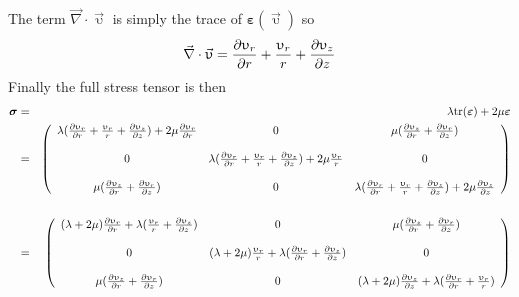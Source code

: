 The term $\vec\nabla \cdot \vec{\upupsilon}$ is simply the trace of ${\bm \varepsilon}(\vec{\upupsilon})$ so 
\[
\vec\nabla \cdot \vec{\upupsilon}
= {\partial \upupsilon_r \over \partial r} 
+{\upupsilon_r \over r}
+{\partial \upupsilon_{z} \over \partial z}
\]
Finally the full stress tensor is then 
\begin{eqnarray}
{\bm \sigma}
&=& \lambda {\rm tr} ({\bm \varepsilon}) + 2 \mu {\bm \varepsilon} \nonumber\\
&=&
\left(
\begin{array}{ccc}
\lambda({\partial  \upupsilon_r \over \partial  r}
+{\upupsilon_r \over r} +{\partial  \upupsilon_{z} \over \partial z}) +
2\mu {\partial  \upupsilon_r \over \partial  r} &
0 & \mu({\partial \upupsilon_{z} \over \partial  r} + {\partial \upupsilon_r \over \partial z} ) \\
\\
0 & \lambda({\partial \upupsilon_r \over \partial r}
+{\upupsilon_r \over r} +{\partial \upupsilon_{z} \over \partial z}) + 2\mu{\upupsilon_r \over r} & 0 \\
\\
\mu({\partial \upupsilon_{z} \over \partial r} + 
{\partial \upupsilon_r \over \partial z} )&0 & 
\lambda({\partial \upupsilon_r \over \partial r}
+{\upupsilon_r \over r} +{\partial \upupsilon_{z} \over \partial z}) +
2\mu{\partial  \upupsilon_{z} \over \partial z}
\end{array}
\right) \nonumber\\ \nonumber\\
&=&
\left(
\begin{array}{ccc}
(\lambda+ 2\mu) {\partial \upupsilon_r \over \partial r}
+\lambda ({\upupsilon_r \over r} +{\partial  \upupsilon_{z} \over \partial z})  &
0 &
\mu({\partial \upupsilon_{z} \over \partial  r} + 
{\partial \upupsilon_r \over \partial z} ) \\
\\
0 &
(\lambda+2\mu) \frac{\upupsilon_r}{r}
+ \lambda({\partial  \upupsilon_r \over \partial r}
+{\partial \upupsilon_{z} \over \partial z}) &
0 \\
\\
\mu({\partial \upupsilon_{z} \over \partial r} + 
{\partial \upupsilon_r \over \partial z} ) &
0 &
(\lambda+2\mu) \frac{\partial \upupsilon_z}{\partial z}
+\lambda({\partial \upupsilon_r \over \partial r}
+{\upupsilon_r \over r} ) 
\end{array}
\right) \nonumber
\end{eqnarray}

